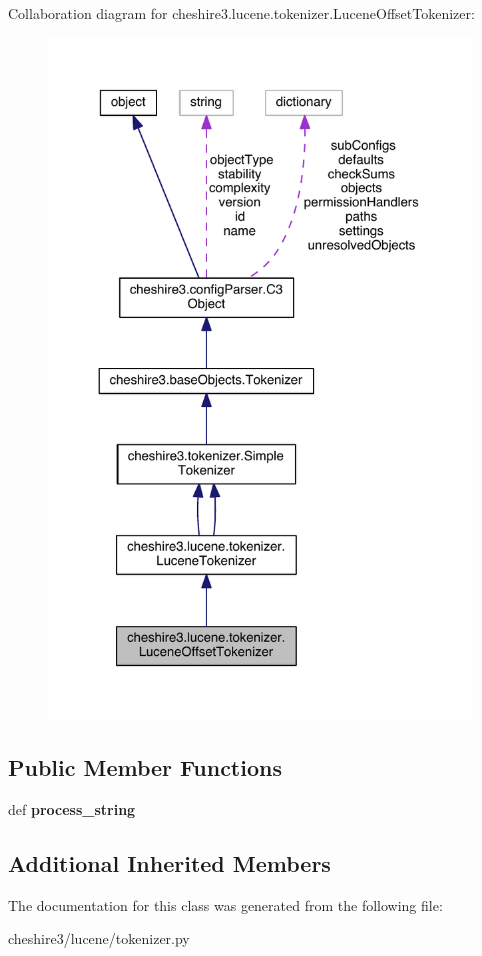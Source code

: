 Collaboration diagram for cheshire3.\-lucene.\-tokenizer.\-Lucene\-Offset\-Tokenizer\-:
\nopagebreak
\begin{figure}[H]
\begin{center}
\leavevmode
\includegraphics[width=326pt]{classcheshire3_1_1lucene_1_1tokenizer_1_1_lucene_offset_tokenizer__coll__graph}
\end{center}
\end{figure}
\subsection*{Public Member Functions}
\begin{DoxyCompactItemize}
\item 
\hypertarget{classcheshire3_1_1lucene_1_1tokenizer_1_1_lucene_offset_tokenizer_afb17eb089fa0defd44b7fb87c13e1b9c}{def {\bfseries process\-\_\-string}}\label{classcheshire3_1_1lucene_1_1tokenizer_1_1_lucene_offset_tokenizer_afb17eb089fa0defd44b7fb87c13e1b9c}

\end{DoxyCompactItemize}
\subsection*{Additional Inherited Members}


The documentation for this class was generated from the following file\-:\begin{DoxyCompactItemize}
\item 
cheshire3/lucene/tokenizer.\-py\end{DoxyCompactItemize}
